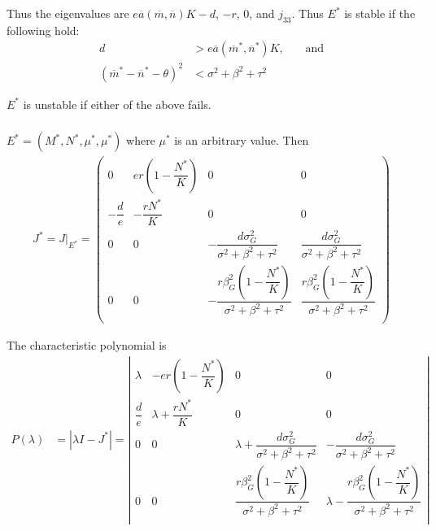 \documentclass[10pt]{beamer}
\begin{document}
\vskip 10pt

\noindent Thus the eigenvalues are $e\overline{a}(\overline{m}, \overline{n})K - d$, $-r$, $0$, and $j_{33}$.  Thus $E^*$ is stable if the following hold:
\begin{align*}
	d &> e\overline{a}(\overline{m}^*, \overline{n}^*)K \text{,}\qquad\text{and} \\[.1cm]
	(\overline{m}^* - \overline{n}^* - \theta)^2 &< \sigma^2 + \beta^2 + \tau^2
\end{align*}

\noindent $E^*$ is unstable if either of the above fails.

\vskip 20pt
							\subsubsection{}

$E^* = (M^*, N^*, \mu^*, \mu^*)$ where $\mu^*$ is an arbitrary value.  Then
\begin{align*}
	J^* = J\big|_{E^*} = \left(
	\begin{array}{cccc}
	0 & er\left(1 - \dfrac{N^*}{K}\right) & 0 & 0 \\[.4cm]
	-\dfrac{d}{e} & -\dfrac{rN^*}{K} & 0 & 0 \\[.4cm]
	0 & 0 & -\dfrac{d\sigma_G^2 }{\sigma^2 + \beta^2 + \tau^2} & \dfrac{d\sigma_G^2 }{\sigma^2 + \beta^2 + \tau^2} \\[.4cm]
	0 & 0 & -\dfrac{r\beta_G^2\left(1 - \dfrac{N^*}{K}\right)}{\sigma^2 + \beta^2 + \tau^2} & \dfrac{r\beta_G^2\left(1 - \dfrac{N^*}{K}\right)}{\sigma^2 + \beta^2 + \tau^2} \\
	\end{array}
	\right)
\end{align*}

\noindent The characteristic polynomial is
\begin{align*}
	P(\lambda) &= \left|{\lambda I - J^*}\right| = \left|
	\begin{array}{cccc}
		\lambda & -er\left(1 - \dfrac{N^*}{K}\right) & 0 & 0 \\[.4cm]
		\dfrac{d}{e} & \lambda + \dfrac{rN^*}{K} & 0 & 0\\
		0 & 0 & \lambda + \dfrac{d\sigma_G^2 }{\sigma^2 + \beta^2 + \tau^2} & -\dfrac{d\sigma_G^2 }{\sigma^2 + \beta^2 + \tau^2} \\[.4cm]
		0 & 0 & \dfrac{r\beta_G^2\left(1 - \dfrac{N^*}{K}\right)}{\sigma^2 + \beta^2 + \tau^2} & \lambda - \dfrac{r\beta_G^2\left(1 - \dfrac{N^*}{K}\right)}{\sigma^2 + \beta^2 + \tau^2} \\
	\end{array}
	\right| \\[.3cm]
\end{align*}
\end{document}
